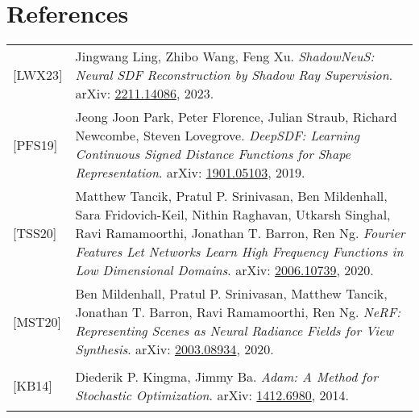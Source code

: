 \documentclass[12pt]{article}
\theoremstyle{definition}
\begin{document}
\section*{References}
\begin{tabular}{@{}p{} p{}}
\hypertarget{[LWX23]}{[LWX23]} & Jingwang Ling, Zhibo Wang, Feng Xu. \textit{ShadowNeuS: Neural SDF Reconstruction by Shadow Ray Supervision}. arXiv: \href{https://arxiv.org/abs/2211.14086}{2211.14086}, 2023. \\
\hypertarget{[PFS19]}{[PFS19]} & Jeong Joon Park, Peter Florence, Julian Straub, Richard Newcombe, Steven Lovegrove. \textit{DeepSDF: Learning Continuous Signed Distance Functions for Shape Representation}. arXiv: \href{https://arxiv.org/abs/1901.05103}{1901.05103}, 2019. \\
\hypertarget{[TSS20]}{[TSS20]} & Matthew Tancik, Pratul P. Srinivasan, Ben Mildenhall, Sara Fridovich-Keil, Nithin Raghavan, Utkarsh Singhal, Ravi Ramamoorthi, Jonathan T. Barron, Ren Ng. \textit{Fourier Features Let Networks Learn High Frequency Functions in Low Dimensional Domains}. arXiv: \href{https://arxiv.org/abs/2006.10739}{2006.10739}, 2020. \\
\hypertarget{[MST20]}{[MST20]} & Ben Mildenhall, Pratul P. Srinivasan, Matthew Tancik, Jonathan T. Barron, Ravi Ramamoorthi, Ren Ng. \textit{NeRF: Representing Scenes as Neural Radiance Fields for View Synthesis}. arXiv: \href{https://arxiv.org/abs/2003.08934}{2003.08934}, 2020. \\
\hypertarget{[KB14]}{[KB14]} & Diederik P. Kingma, Jimmy Ba. \textit{Adam: A Method for Stochastic Optimization}. arXiv: \href{https://arxiv.org/abs/1412.6980}{1412.6980}, 2014.

\end{tabular}
\end{document}
